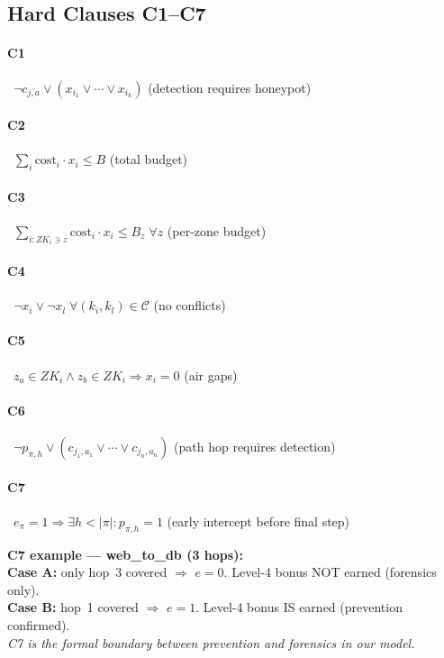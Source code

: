 \documentclass[journal]{IEEEtran}
\newcommand{\calC}{\mathcal{C}}
\begin{document}
\subsection{Hard Clauses C1--C7}

\paragraph{C1}~$\neg c_{j,a}\vee(x_{i_1}\vee\cdots\vee x_{i_k})$
\hfill(detection requires honeypot)
\paragraph{C2}~$\sum_i\mathrm{cost}_i\cdot x_i\leq B$
\hfill(total budget)
\paragraph{C3}~$\sum_{i:ZK_i\ni z}\mathrm{cost}_i\cdot x_i\leq B_z\;\forall z$
\hfill(per-zone budget)
\paragraph{C4}~$\neg x_i\vee\neg x_l\;\forall(k_i,k_l)\in\calC$
\hfill(no conflicts)
\paragraph{C5}~$z_a\in ZK_i\wedge z_b\in ZK_i\Rightarrow x_i=0$
\hfill(air gaps)
\paragraph{C6}~$\neg p_{\pi,h}\vee(c_{j_1,a_1}\vee\cdots\vee c_{j_n,a_n})$
\hfill(path hop requires detection)
\paragraph{C7}~$e_\pi=1\Rightarrow\exists h<|\pi|:p_{\pi,h}=1$
\hfill(early intercept before final step)

\begin{examplebox}
\textbf{C7 example --- web\_to\_db (3 hops):}\\
\textbf{Case A:} only hop~3 covered $\Rightarrow$ $e=0$.
Level-4 bonus NOT earned (forensics only).\\
\textbf{Case B:} hop~1 covered $\Rightarrow$ $e=1$.
Level-4 bonus IS earned (prevention confirmed).\\
\textit{C7 is the formal boundary between prevention and
forensics in our model.}
\end{examplebox}
\end{document}
